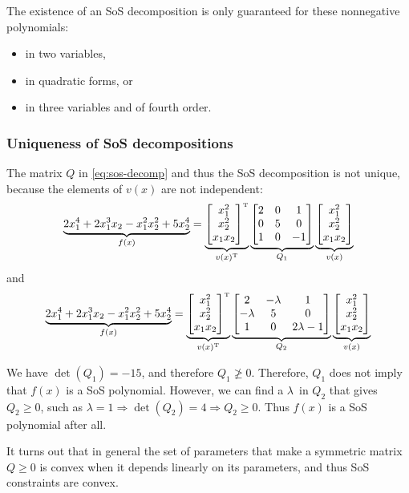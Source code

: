 The existence of an SoS decomposition is only guaranteed for these nonnegative polynomials:
%
\begin{itemize}
  \item in two variables,
  \item in quadratic forms, or
  \item in three variables and of fourth order.
\end{itemize}

\subsubsection{Uniqueness of SoS decompositions}
The matrix $Q$ in \eqref{eq:sos-decomp} and thus the SoS decomposition is not unique, because the elements of $v(x)$ are not independent:
%
\begin{equation}
  \underbrace{2x_1^4 + 2x_1^3x_2 - x_1^2x_2^2 + 5x_2^4}_{f(x)}
  =
  \underbrace{\bmat{x_1^2 \\ x_2^2 \\ x_1x_2}\tp}_{v(x)\tp}
  \underbrace{\bmat{2 & 0 & 1 \\ 0 & 5 & 0 \\ 1 & 0 & -1}}_{Q_1}
  \underbrace{\bmat{x_1^2 \\ x_2^2 \\ x_1x_2}}_{v(x)}
\end{equation}
%
and
%
\begin{equation}
  \underbrace{2x_1^4 + 2x_1^3x_2 - x_1^2x_2^2 + 5x_2^4}_{f(x)}
  =
  \underbrace{\bmat{x_1^2 \\ x_2^2 \\ x_1x_2}\tp}_{v(x)\tp}
  \underbrace{\bmat{2 & -\lambda & 1 \\ -\lambda & 5 & 0 \\ 1 & 0 & 2\lambda -1}}_{Q_2}
  \underbrace{\bmat{x_1^2 \\ x_2^2 \\ x_1x_2}}_{v(x)}
\end{equation}

We have $\det(Q_1) = -15$, and therefore $Q_1 \ngeq 0$. Therefore, $Q_1$ does not imply that $f(x)$ is a SoS polynomial. However, we can find a $\lambda$ in $Q_2$ that gives $Q_2 \geq 0$, such as $\lambda = 1 \Rightarrow \det(Q_2) = 4 \Rightarrow Q_2 \geq 0$. Thus $f(x)$ is a SoS polynomial after all.

It turns out that in general the set of parameters that make a symmetric matrix $Q \geq 0$ is convex when it depends linearly on its parameters, and thus SoS constraints are convex.

